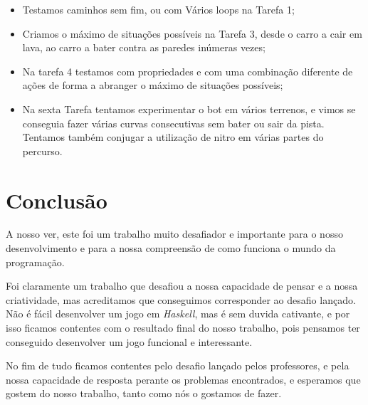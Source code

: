 \documentclass[a4paper]{report} %
\begin{document}
 \begin{itemize}
    \item Testamos caminhos sem fim, ou com Vários loops na Tarefa 1;
    \end{itemize}
    \begin{itemize}
    \item Criamos o máximo de situações possíveis na Tarefa 3, desde o carro a cair em lava, ao carro a bater contra as paredes inúmeras vezes; 
   \end{itemize}
   \begin{itemize}
    \item Na tarefa 4 testamos com propriedades e com uma combinação diferente de ações de forma a abranger o máximo de situações possíveis;
   \end{itemize}
   \begin{itemize} \item Na sexta Tarefa tentamos experimentar o bot em vários terrenos, e vimos se conseguia fazer várias curvas consecutivas sem bater ou sair da pista. Tentamos também conjugar a utilização de nitro em várias partes do percurso.
   \end{itemize} 
 
    



\chapter{Conclusão}

   A nosso ver, este foi um trabalho muito desafiador e importante para o nosso desenvolvimento e para a nossa compreensão de como funciona o mundo da programação.
   
   Foi claramente um trabalho que desafiou a nossa capacidade de pensar e a nossa criatividade, mas acreditamos que conseguimos corresponder ao desafio lançado.
   Não é fácil desenvolver um jogo em \textit{Haskell}, mas é sem duvida cativante, e por isso ficamos contentes com o resultado final do nosso trabalho, pois pensamos ter conseguido desenvolver um jogo funcional e interessante. 
   
   No fim de tudo ficamos contentes pelo desafio lançado pelos professores, e pela nossa capacidade de resposta perante os problemas encontrados, e esperamos que gostem do nosso trabalho, tanto como nós o gostamos de fazer.
   
   
   


    
\end{document}
